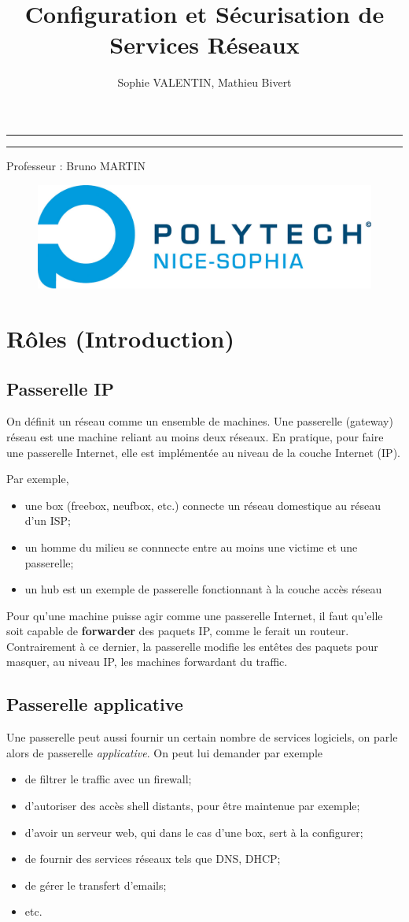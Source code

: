 \documentclass[a4paper]{article}
\title{Configuration et Sécurisation de Services Réseaux}
\author{Sophie VALENTIN, Mathieu Bivert}
\makeatletter
\def\maketitle{
	\null
	\thispagestyle{empty}
	\vskip 1cm
	\begin{center}
		\normalfont\large\huge\@author
	\end{center}
	\vfil
	\vfil
	\vfil
	\vfil
	\vfil
	\vfil
	\vfil
	\vfil
	\vfil
	\vfil
	\vfil
	\hrule height 2pt
	\par
	\begin{center}
				\huge \strut \@title \par
				\@date
	\end{center}
	\hrule height 2pt
	\par
	\vfil
	\vfil
	\vfil
	\vfil
	\vfil
	\vfil
	\vfil
	\vfil
	\vfil
	\vfil
	\vfil
	\vfil
	\vfil
	\vfil
	\vfil
	\vfil
	\vfil
	\vfil
	\vfil
	\vfil
	\vfil
	\vfil
	\vfil
	\vfil
	\vfil
	\begin{center}
  			\huge Professeur : Bruno MARTIN
    \end{center}
	\null
	\begin{figure}[!ht]
		\centering
		\includegraphics[scale=.5]{polytech.png}
	\end{figure}
	\vfil
	\cleardoublepage
}
\makeatother
\begin{document}
\maketitle

\newpage
\tableofcontents

\newpage
\section{Rôles (Introduction)}
\subsection{Passerelle IP}
On définit un réseau comme un ensemble de machines. Une
passerelle (gateway) réseau est une machine reliant au moins deux réseaux.
En pratique, pour faire une passerelle Internet, elle est implémentée
au niveau de la couche Internet (IP).

Par exemple,
\begin{itemize}
	\item une box (freebox, neufbox, etc.) connecte un réseau domestique
		au réseau d'un ISP;
	\item un homme du milieu se connnecte entre au moins une victime et
		une passerelle;
	\item un hub est un exemple de passerelle fonctionnant à la couche
		accès réseau
\end{itemize}

Pour qu'une machine puisse agir comme une passerelle Internet, il faut
qu'elle soit capable de \textbf{forwarder} des paquets IP, comme le ferait un
routeur. Contrairement à ce dernier, la passerelle modifie les entêtes des paquets
pour masquer, au niveau IP, les machines forwardant du traffic.

\subsection{Passerelle applicative}
Une passerelle peut aussi fournir un certain nombre de services logiciels,
on parle alors de passerelle \textit{applicative}. On peut lui demander
par exemple
\begin{itemize}
	\item de filtrer le traffic avec un firewall;
	\item d'autoriser des accès shell distants, pour être maintenue par exemple;
	\item d'avoir un serveur web, qui dans le cas d'une box, sert à la
		configurer;
	\item de fournir des services réseaux tels que DNS, DHCP;
	\item de gérer le transfert d'emails;
	\item etc.
\end{itemize}
\end{document}
